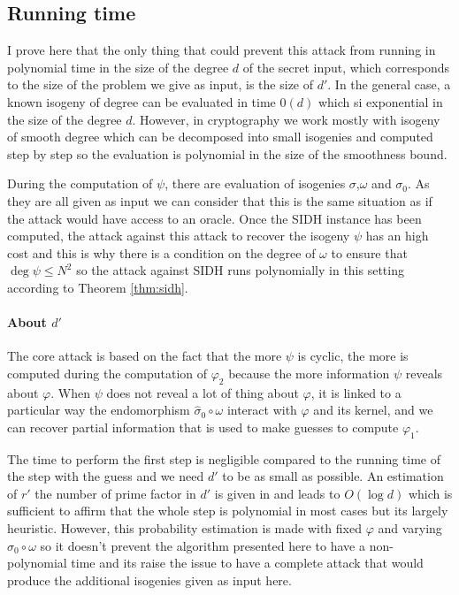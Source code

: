 \documentclass[12pt,a4paper]{article}
\begin{document}
			


				\subsection{Running time}


				I prove here that the only thing that could prevent this attack from running in polynomial time
				in the size of the degree $d$ of the 
				secret input, which corresponds to the size of the problem we give as input, is the size of $d'$.
				In the general case,
				a known isogeny of degree can be evaluated in time $0(d)$ which si exponential in the size of the
				degree $d$. However, in cryptography we work mostly with isogeny of smooth degree which can be
				decomposed into small isogenies and computed step by step so the evaluation is polynomial in the
				size of the smoothness bound.

				During the computation of $\psi$, there are evaluation of isogenies $\sigma$,$\omega$ and
				$\sigma_0$. As they are all given as input we can consider that this is the same situation as if
				the attack would have access to an oracle. Once the SIDH instance has been computed, the attack
				against this attack to recover the isogeny $\psi$ has an high cost and this is why 
				there is a condition on the degree of $\omega$ to ensure that $\deg\psi \leq N^2$ so the attack
				against SIDH runs polynomially in this setting according to Theorem \ref{thm:sidh}.
				
			\paragraph{About $d'$}
				The core attack is based on the fact that the more $\psi$ is cyclic, the more is computed during
				the computation of $\varphi_2$ because the more information $\psi$ reveals about $\varphi$.
				When $\psi$ does not reveal a lot of thing about $\varphi$, it is linked to a particular way the
				endomorphism $\widehat\sigma_0\circ\omega$ interact with $\varphi$ and its kernel, and we can
				recover partial information that is used to make guesses to compute $\varphi_1$. 

				The time to perform the first step is negligible compared to the running time of the step with
				the guess and we need $d'$ to be as small as possible. An estimation of $r'$ the number of prime
				factor in $d'$ is given in \cite{polyCIST} and leads to $O(\log d)$ which is sufficient to affirm
				that the whole step is polynomial in most cases but its largely heuristic.
				However, this probability estimation is made 
				with fixed $\varphi$ and varying $\widehat\sigma_0\circ\omega$ so it doesn't prevent the
				algorithm presented here to have a non-polynomial time and its raise the issue to have a complete
				attack that would produce the additional isogenies given as input here.
				
\end{document}
